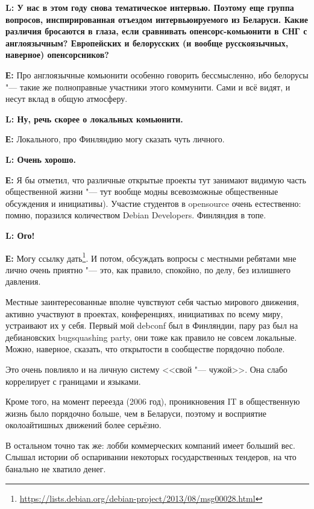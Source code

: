\documentclass[10pt, a5paper]{article}
\begin{document}
{\noindent \bf L: У нас в этом году снова тематическое интервью. Поэтому еще группа вопросов, инспирированная отъездом интервьюируемого из Беларуси. Какие различия бросаются в глаза, если сравнивать опенсорс-комьюнити в
СНГ с англоязычным? Европейских и белорусских (и вообще русскоязычных, наверное) опенсорсников?}

{\noindent \bf Е:} Про англоязычные комьюнити особенно говорить бессмысленно, ибо белорусы "--- такие же полноправные участники этого коммунити. Сами и всё видят, и несут вклад в общую атмосферу.

{\noindent \bf L: Ну, речь скорее о локальных комьюнити. }

{\noindent \bf Е:} Локального, про Финляндию могу сказать чуть личного.

{\noindent \bf L: Очень хорошо. }

{\noindent \bf Е:} Я бы отметил, что различные открытые проекты тут занимают видимую часть 
общественной жизни "--- тут вообще модны всевозможные общественные обсуждения и
инициативы). Участие студентов в opensource очень естественно: помню, поразился количеством Debian Developers. Финляндия в топе. 

{\noindent \bf L: Ого! }

{\noindent \bf Е:} Могу ссылку дать\footnote{\url{https://lists.debian.org/debian-project/2013/08/msg00028.html}}. И потом, обсуждать
вопросы с местными ребятами мне лично очень приятно "--- это, как правило, спокойно, по делу, без излишнего давления.

Местные заинтересованные вполне чувствуют себя частью мирового движения, активно участвуют в проектах, конференциях, инициативах по всему миру, устраивают их у себя. Первый мой debconf был в Финляндии, пару раз был на
дебиановских bug\linebreak squashing party, они тоже как правило не совсем локальные. Можно, наверное, сказать, что открытости в сообществе порядочно поболе.

Это очень повлияло и на личную систему <<свой "--- чужой>>. Она слабо коррелирует с границами и языками.

Кроме того, на момент переезда (2006 год), проникновения IT в общественную жизнь было порядочно больше, чем в Беларуси, поэтому и восприятие околоайтишных движений более серьёзно.

В остальном точно так же: лобби коммерческих компаний имеет больший вес. Слышал истории об оспаривании некоторых государственных тендеров, на что банально не хватило денег.
\end{document}
